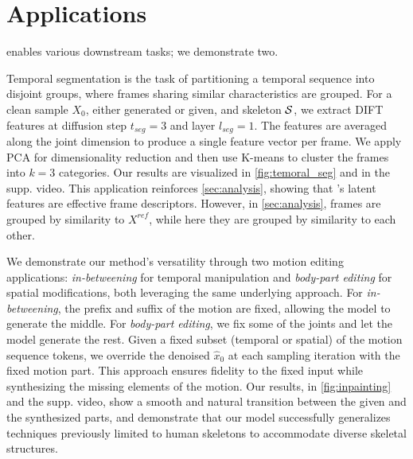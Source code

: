 \section{Applications} \label{sec:applications}
\algoname enables various downstream tasks; we demonstrate two.

Temporal segmentation is the task of partitioning a temporal sequence into disjoint groups, where frames sharing similar characteristics are grouped. 
For a clean sample $X_{0}$, either generated or given, and skeleton $\mathcal{S}$, we extract DIFT features at diffusion step $t_{seg}\!=\!\!3$ and layer $l_{seg}\!=\!\!1$. The features are averaged along the joint dimension to produce a single feature vector per frame. We apply PCA for dimensionality reduction and then use K-means to cluster the frames into $k\!\!=\!\!3$ categories. Our results are visualized in \cref{fig:temoral_seg} and in the supp. video.
This application reinforces \cref{sec:analysis}, showing that \algoname's latent features are effective frame descriptors.
However, in \cref{sec:analysis}, frames are grouped by similarity to $X^{ref}$, while here they are grouped by similarity to each other.


We demonstrate our method's versatility through two motion editing applications: \emph{in-betweening} for temporal manipulation and \emph{body-part editing}  for spatial modifications, both leveraging the same underlying approach.
For \emph{in-betweening}, the prefix and suffix of the motion are fixed, allowing the model to generate the middle.
For \emph{body-part editing}, we fix some of the joints and let the model generate the rest.
Given a fixed subset (temporal or spatial) of the motion sequence tokens, we override the denoised $\hat{x}_{0}$ at each sampling iteration with the fixed motion part. 
This approach ensures fidelity to the fixed input while synthesizing the missing elements of the motion.
Our results, in \cref{fig:inpainting} and the supp. video, show a smooth and natural transition between the given and the synthesized parts, and demonstrate that our model successfully generalizes techniques previously limited to human skeletons \cite{tevet2023human} to accommodate diverse skeletal structures.




